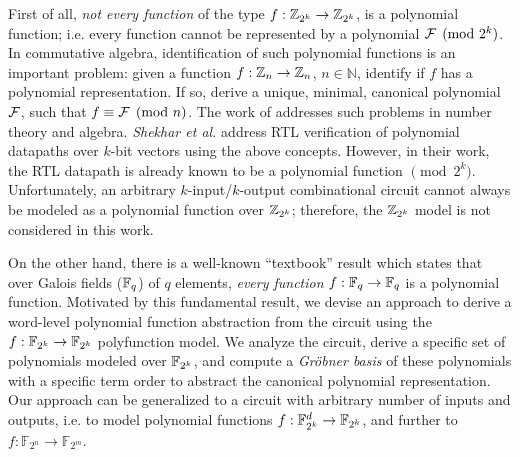 First of all, {\it not every
  function} of the type $f: {\mathbb{Z}}_{2^k} \rightarrow {\mathbb{Z}}_{2^k}$, is a
polynomial function; i.e. every function cannot be represented by a
polynomial ${\mathcal{F}} \pmod{ 2^k}$.  In commutative algebra, identification of
such polynomial functions is an important problem: given a function
$f: {\mathbb{Z}}_n \rightarrow {\mathbb{Z}}_n$, $n \in {\mathbb{N}}$, identify if $f$ has
a polynomial representation. If so, derive a unique,
minimal, canonical polynomial ${\mathcal{F}}$, such that $f \equiv  {\mathcal{F}} \pmod{
  n}$. 
The work of 
\cite{singmaster} 
addresses such problems in number theory and algebra. {\it
 Shekhar et al.} \cite{shekhar:tcad07} address RTL verification
of polynomial datapaths over $k$-bit vectors using the above
concepts. However, in their work, the RTL datapath is already known to
be a polynomial function $\pmod{ 2^k}$. Unfortunately, an arbitrary
$k$-input/$k$-output combinational circuit cannot always be modeled as
a polynomial function over ${\mathbb{Z}}_{2^k}$; therefore, the ${\mathbb{Z}}_{2^k}$ model
is not considered in this work. 

On the other hand, there is a well-known ``textbook'' result
\cite{ff:1997} which states that over Galois fields (${\mathbb{F}}_{q}$) of $q$
elements, {\it every function} $f: {\mathbb{F}}_{q} \rightarrow {\mathbb{F}}_{q}$ is a
polynomial function. 
Motivated by this fundamental result, we devise an approach
to derive a word-level polynomial function abstraction from the
circuit using the $f: {\mathbb{F}}_{2^k} \rightarrow {\mathbb{F}}_{2^k}$ polyfunction model. 
We analyze the circuit, derive a specific set of polynomials modeled
over ${\mathbb{F}}_{2^k}$, and compute a {\it Gr\"obner basis} of these polynomials
with a specific term order to abstract the canonical polynomial
representation. Our approach can be generalized to a circuit with
arbitrary number of inputs and outputs, i.e. to model polynomial
functions $f: {\mathbb{F}}_{2^k}^d \rightarrow {\mathbb{F}}_{2^k}$, and further to $f:
{\mathbb{F}}_{2^n} \rightarrow {\mathbb{F}}_{2^m}$.  


